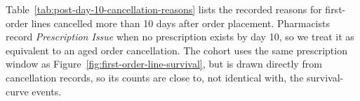 Table~\ref{tab:post-day-10-cancellation-reasons} lists the recorded
reasons for first-order lines cancelled more than 10 days after order
placement. Pharmacists record \emph{Prescription Issue} when no
prescription exists by day 10, so we treat it as equivalent to an aged
order cancellation. The cohort uses the same prescription window as
Figure~\ref{fig:first-order-line-survival}, but is drawn directly from
cancellation records, so its counts are close to, not identical with,
the survival-curve events.

